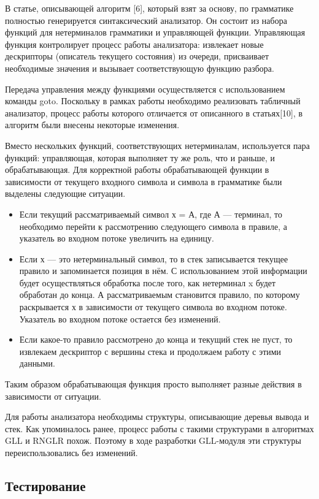 В статье, описывающей алгоритм [6], который взят за основу, по грамматике полностью генерируется синтаксический анализатор. Он состоит из набора функций для нетерминалов грамматики и управляющей функции. Управляющая функция контролирует процесс работы анализатора: извлекает новые дескрипторы (описатель текущего состояния) из очереди, присваивает необходимые значения и вызывает соответствующую функцию разбора.

Передача управления между функциями осуществляется с использованием команды goto. Поскольку в рамках работы необходимо реализовать табличный анализатор,  процесс работы которого отличается от описанного в статьях[10], в алгоритм были внесены некоторые изменения.

Вместо нескольких функций, соответствующих нетерминалам, используется пара функций: управляющая, которая выполняет ту же роль, что  и раньше,  и обрабатывающая. Для корректной работы обрабатывающей функции в зависимости от текущего входного символа и символа в грамматике были выделены следующие ситуации.

\begin{itemize}
\item Если текущий рассматриваемый символ х = А, где А --- терминал, то необходимо перейти к рассмотрению следующего символа в правиле, а указатель во входном потоке увеличить на единицу.
\item Если х --- это нетерминальный символ, то в стек записывается текущее правило и запоминается позиция в нём. С использованием этой информации будет осуществляться обработка после того, как нетерминал x будет обработан до конца. А рассматриваемым становится правило, по которому раскрывается х в зависимости от текущего символа во входном потоке. Указатель во входном потоке остается без изменений.
\item Если какое-то правило рассмотрено до конца и текущий стек не пуст, то извлекаем дескриптор с вершины стека и продолжаем работу с этими данными.
\end{itemize}

Таким образом обрабатывающая функция просто выполняет разные действия в зависимости от ситуации.

Для работы анализатора необходимы структуры, описывающие деревья вывода и стек. Как упоминалось ранее, процесс работы с такими структурами в алгоритмах GLL и RNGLR похож. Поэтому в ходе разработки GLL-модуля эти структуры переиспользовались без изменений. 

\subsection{Тестирование}

